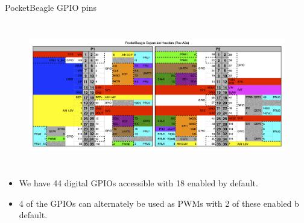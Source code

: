\begin{frame}
   {PocketBeagle GPIO pins}
   \begin{figure}[H]
      \centering
      \includegraphics[height=2.5in]{IMAGES/pocketbeagle-pins}
   \end{figure}
   \begin{itemize}
      \item We have 44 digital GPIOs accessible with 18 enabled by
         default.
      \item 4 of the GPIOs can alternately be used as PWMs with 2 of
         these enabled b default.
   \end{itemize}
\end{frame}

\cprotect{}


